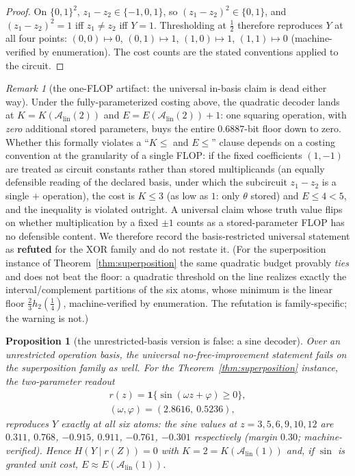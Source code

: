 \documentclass[twocolumn,10pt]{article}
\newtheorem{proposition}[theorem]{Proposition}
\theoremstyle{definition}
\theoremstyle{remark}
\newtheorem{remark}[theorem]{Remark}
\newcommand{\cA}{\mathcal{A}}
\newcommand{\Alin}{\cA_{\mathrm{lin}}}
\newcommand{\hb}{h_2}
\begin{document}
\begin{proof}
On $\{0,1\}^2$, $z_1 - z_2 \in \{-1, 0, 1\}$, so
$(z_1 - z_2)^2 \in \{0, 1\}$, and $(z_1 - z_2)^2 = 1$ iff $z_1 \neq z_2$
iff $Y = 1$. Thresholding at $\tfrac12$ therefore reproduces $Y$ at all
four points: $(0,0) \mapsto 0$, $(0,1) \mapsto 1$, $(1,0) \mapsto 1$,
$(1,1) \mapsto 0$ (machine-verified by enumeration). The cost counts are
the stated conventions applied to the circuit.
\end{proof}

\begin{remark}[the one-FLOP artifact: the universal in-basis claim is dead
either way]
\label{rem:costing-artifact}
\sloppy
Under the fully-parameterized costing above, the quadratic decoder lands
at $K = K(\Alin(2))$ and $E = E(\Alin(2)) + 1$: one squaring operation,
with \emph{zero} additional stored parameters, buys the entire
$0.6887$-bit floor down to zero. Whether this formally violates a
``$K \le$ and $E \le$'' clause depends on a costing convention at the
granularity of a single FLOP: if the fixed coefficients $(1, -1)$ are
treated as circuit constants rather than stored multiplicands (an
equally defensible reading of the declared basis, under which the
subcircuit $z_1 - z_2$ is a single $+$ operation), the cost is
$K \le 3$ (as low as $1$: only $\theta$ stored) and $E \le 4 < 5$, and the
inequality is violated outright. A universal claim whose truth value flips
on whether multiplication by a fixed $\pm 1$ counts as a stored-parameter
FLOP has no defensible content. We therefore record the basis-restricted
universal statement as \textbf{refuted} for the XOR family and do not
restate it. (For the superposition instance of
Theorem~\ref{thm:superposition} the same quadratic budget provably
\emph{ties} and does not beat the floor: a quadratic threshold on the line
realizes exactly the interval/complement partitions of the six atoms,
whose minimum is the linear floor $\tfrac23 \hb(\tfrac14)$,
machine-verified by enumeration. The refutation is family-specific; the
warning is not.)
\end{remark}

\begin{proposition}[the unrestricted-basis version is false: a sine
decoder]
\label{prop:sine}
Over an unrestricted operation basis, the universal no-free-improvement
statement fails on the superposition family as well. For the
Theorem~\ref{thm:superposition} instance, the two-parameter readout
\begin{gather*}
r(z) = \mathbf 1\{\sin(\omega z + \varphi) \ge 0\},
\\
(\omega, \varphi) = (2.8616,\ 0.5236),
\end{gather*}
reproduces $Y$ exactly at all six atoms: the sine values at
$z = 3, 5, 6, 9, 10, 12$ are $0.311$, $0.768$, $-0.915$, $0.911$,
$-0.761$, $-0.301$ respectively (margin $0.30$; machine-verified).
Hence $H(Y \mid r(Z)) = 0$ with
$K = 2 = K(\Alin(1))$ and, if $\sin$ is granted unit cost,
$E \approx E(\Alin(1))$.
\end{proposition}
\end{document}
